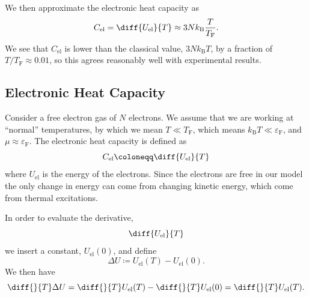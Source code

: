 \documentclass[fleqn]{NotesClass}
\newcommand*{\boltzmann}{k_{\mathrm{B}}}
\newcommand*{\fermi}{\mathrm{F}}
\begin{document}
    We then approximate the electronic heat capacity as
    \begin{equation}\label{eqn:electronic heat capacity estimate}
        C_{\mathrm{el}} = \diff{U_{\mathrm{el}}}{T} \approx 3N\boltzmann \frac{T}{T_{\fermi}}.
    \end{equation}
    We see that \(C_{\mathrm{el}}\) is lower than the classical value, \(3N\boltzmann T\), by a fraction of \(T/T_{\fermi} \approx 0.01\), so this agrees reasonably well with experimental results.
    
    \subsection{Electronic Heat Capacity}
    Consider a free electron gas of \(N\) electrons.
    We assume that we are working at \enquote{normal} temperatures, by which we mean \(T \ll T_{\fermi}\), which means \(\boltzmann T \ll \varepsilon_{\fermi}\), and \(\mu \approx \varepsilon_{\fermi}\).
    The electronic heat capacity is defined as
    \begin{equation}
        C_{\mathrm{el}} \coloneqq \diff{U_{\mathrm{el}}}{T}
    \end{equation}
    where \(U_{\mathrm{el}}\) is the energy of the electrons.
    Since the electrons are free in our model the only change in energy can come from changing kinetic energy, which come from thermal excitations.
    
    In order to evaluate the derivative,
    \begin{equation}
        \diff{U_{\mathrm{el}}}{T}
    \end{equation}
    we insert a constant, \(U_{\mathrm{el}}(0)\), and define
    \begin{equation}
        \Delta U \coloneqq U_{\mathrm{el}}(T) - U_{\mathrm{el}}(0).
    \end{equation}
    We then have
    \begin{equation}
        \diff{}{T}\Delta U = \diff{}{T}U_{\mathrm{el}}(T) - \diff{}{T}U_{\mathrm{el}}(0) = \diff{}{T}U_{\mathrm{el}}(T).
    \end{equation}
    
\end{document}
